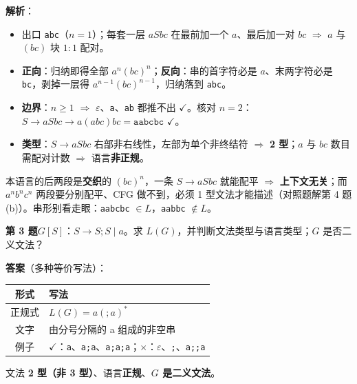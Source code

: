 \documentclass[12pt,a4paper,fontset=windows]{ctexart}
\newcommand{\ok}{\ensuremath{\checkmark}}
\newcommand{\bad}{\ensuremath{\times}}
\newcommand{\imp}{\ensuremath{\Rightarrow}}
\begin{document}
\textbf{解析}：
\begin{itemize}
\item 出口 \texttt{abc}（$n=1$）；每套一层 $aSbc$ 在最前加一个 $a$、最后加一对 $bc$ \imp{} $a$ 与 $(bc)$ 块 $1{:}1$ 配对。
\item \textbf{正向}：归纳即得全部 $a^n(bc)^n$；\textbf{反向}：串的首字符必是 $a$、末两字符必是 \texttt{bc}，剥掉一层得 $a^{n-1}(bc)^{n-1}$，归纳落到 \texttt{abc}。
\item \textbf{边界}：$n \ge 1$ \imp{} $\varepsilon$、\texttt{a}、\texttt{ab} 都推不出 \ok。核对 $n=2$：$S \to aSbc \to a(abc)bc = \texttt{aabcbc}$ \ok。
\item \textbf{类型}：$S \to aSbc$ 右部非右线性，左部为单个非终结符 \imp{} \textbf{2 型}；$a$ 与 $bc$ 数目需配对计数 \imp{} 语言\textbf{非正规}。
\end{itemize}

\begin{tipbox}
本语言的后两段是\textbf{交织}的 $(bc)^n$，一条 $S \to aSbc$ 就能配平 \imp{} \textbf{上下文无关}；而 $a^n b^n c^n$ 两段要分别配平、CFG 做不到，必须 1 型文法才能描述（对照题解第 4 题 (b)）。串形别看走眼：\texttt{aabcbc} $\in L$，\texttt{aabbc} $\notin L$。
\end{tipbox}

\begin{qbox}
{\large\bfseries 第 3 题}\quad $G[S]$：$S \to S;S \mid a$。求 $L(G)$，并判断文法类型与语言类型；$G$ 是否二义文法？
\end{qbox}

\textbf{答案}（多种等价写法）：

\begin{center}
\renewcommand{\arraystretch}{1.25}
\begin{tabular}{c p{11.2cm}}
\toprule
\textbf{形式} & \textbf{写法} \\
\midrule
正规式 & $L(G)=a( ; a)^*$ \\
文字 & 由分号分隔的 a 组成的非空串 \\
例子 & \ok：\texttt{a}、\texttt{a;a}、\texttt{a;a;a}；\bad：$\varepsilon$、\texttt{;}、\texttt{a;;a} \\
\bottomrule
\end{tabular}
\end{center}

文法 \textbf{2 型（非 3 型）}、语言\textbf{正规}、\textbf{$G$ 是二义文法}。
\end{document}
